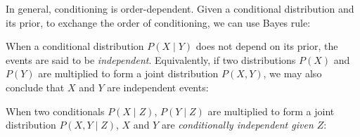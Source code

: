 \documentclass[11pt]{article}
\begin{document}
\noindent In general, conditioning is order-dependent. Given a conditional distribution and its prior, to exchange the order of conditioning, we can use Bayes rule:

\begin{prooftree}
\end{prooftree}

\noindent When a conditional distribution $P(X \mid Y)$ does not depend on its prior, the events are said to be \textit{independent}. Equivalently, if two distributions $P(X)$ and $P(Y)$ are multiplied to form a joint distribution $P(X, Y)$, we may also conclude that $X$ and $Y$ are independent events:


\noindent When two conditionals $P(X \mid Z)$, $P(Y \mid Z)$ are multiplied to form a joint distribution $P(X, Y \mid Z)$, $X$ and $Y$ are \textit{conditionally independent given $Z$}:

\begin{prooftree}
\end{prooftree}

%
\end{document}
